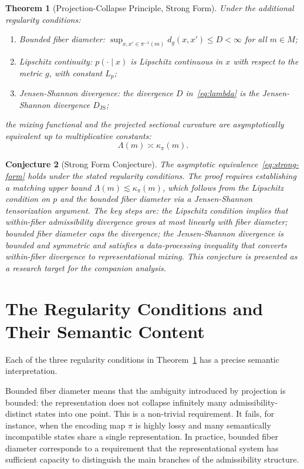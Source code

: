 \documentclass[12pt, oneside]{book}
\theoremstyle{plain-flyxion}
\newtheorem{theorem}{Theorem}[chapter]
\newtheorem{conjecture}[theorem]{Conjecture}
\theoremstyle{definition-flyxion}
\newcommand{\kpi}{\kappa_{\pi}}
\newcommand{\Lam}{\Lambda}
\begin{document}
\begin{theorem}[Projection-Collapse Principle, Strong Form]\label{thm:strong}
Under the additional regularity conditions:
\begin{enumerate}
  \item[(i)] \emph{Bounded fiber diameter}: $\sup_{x,x'\in\pi^{-1}(m)} d_g(x,x')\leq
    D < \infty$ for all $m\in M$;
  \item[(ii)] \emph{Lipschitz continuity}: $p(\cdot\mid x)$ is Lipschitz continuous in
    $x$ with respect to the metric $g$, with constant $L_p$;
  \item[(iii)] \emph{Jensen-Shannon divergence}: the divergence $D$ in~\eqref{eq:lambda}
    is the Jensen-Shannon divergence $D_{\mathrm{JS}}$;
\end{enumerate}
the mixing functional and the projected sectional curvature are asymptotically equivalent
up to multiplicative constants:
\begin{equation}\label{eq:strong-form}
\Lam(m) \asymp \kpi(m).
\end{equation}
\end{theorem}

\begin{conjecture}[Strong Form Conjecture]
The asymptotic equivalence~\eqref{eq:strong-form} holds under the stated regularity
conditions. The proof requires establishing a matching upper bound $\Lam(m) \lesssim
\kpi(m)$, which follows from the Lipschitz condition on $p$ and the bounded fiber
diameter via a Jensen-Shannon tensorization argument. The key steps are: the Lipschitz
condition implies that within-fiber admissibility divergence grows at most linearly with
fiber diameter; bounded fiber diameter caps the divergence; the Jensen-Shannon divergence
is bounded and symmetric and satisfies a data-processing inequality that converts
within-fiber divergence to representational mixing. This conjecture is presented as a
research target for the companion analysis.
\end{conjecture}

\section{The Regularity Conditions and Their Semantic Content}

Each of the three regularity conditions in Theorem~\ref{thm:strong} has a precise
semantic interpretation.

Bounded fiber diameter means that the ambiguity introduced by projection is bounded: the
representation does not collapse infinitely many admissibility-distinct states into one
point. This is a non-trivial requirement. It fails, for instance, when the encoding map
$\pi$ is highly lossy and many semantically incompatible states share a single
representation. In practice, bounded fiber diameter corresponds to a requirement that
the representational system has sufficient capacity to distinguish the main branches of
the admissibility structure.
\end{document}
